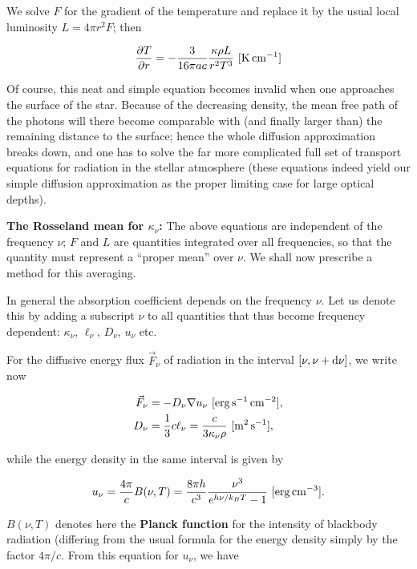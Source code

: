 \documentclass[a4paper,10pt]{article}
\begin{document}
{\noindent}We solve $F$ for the gradient of the temperature and replace it by the usual local luminosity $L=4\pi r^2F$; then

\begin{align*}
    \frac{\partial T}{\partial r} = - \frac{3}{16\pi ac} \frac{\kappa\rho L}{r^2T^3} ~ [{\rm K\,cm^{-1}}]
\end{align*}

{\noindent}Of course, this neat and simple equation becomes invalid when one approaches the surface of the star. Because of the decreasing density, the mean free path of the photons will there become comparable with (and finally larger than) the remaining distance to the surface; hence the whole diffusion approximation breaks down, and one has to solve the far more complicated full set of transport equations for radiation in the stellar atmosphere (these equations indeed yield our simple diffusion approximation as the proper limiting case for large optical depths).

{\noindent}\textbf{The Rosseland mean for $\kappa_\nu$:} The above equations are independent of the frequency $\nu$; $F$ and $L$ are quantities integrated over all frequencies, so that the quantity   must represent a ``proper mean'' over $\nu$. We shall now prescribe a method for this averaging.

{\noindent}In general the absorption coefficient depends on the frequency $\nu$. Let us denote this by adding a subscript $\nu$ to all quantities that thus become frequency dependent: $\kappa_\nu$, $\ell_\nu$, $D_\nu$, $u_\nu$ etc.

{\noindent}For the diffusive energy flux $\vec{F}_\nu$ of radiation in the interval $[\nu,\nu+{\rm d}\nu]$, we write now

\begin{align*}
    \vec{F}_\nu &= -D_\nu \nabla u_\nu ~ [{\rm erg\,s^{-1}\,cm^{-2}}], \\
    D_\nu &= \frac{1}{3}c\ell_\nu = \frac{c}{3\kappa_\nu\rho} ~ [{\rm m^2\,s^{-1}}],
\end{align*}

{\noindent}while the energy density in the same interval is given by

\begin{align*}
    u_\nu = \frac{4\pi}{c}B(\nu,T) = \frac{8\pi h}{c^3} \frac{\nu^3}{e^{h\nu/k_BT}-1}  ~ [{\rm erg\,cm^{-3}}].
\end{align*}

{\noindent}$B(\nu,T)$ denotes here the \textbf{Planck function} for the intensity of blackbody radiation (differing from the usual formula for the energy density simply by the factor $4\pi/c$. From this equation for $u_\nu$, we have
\end{document}

